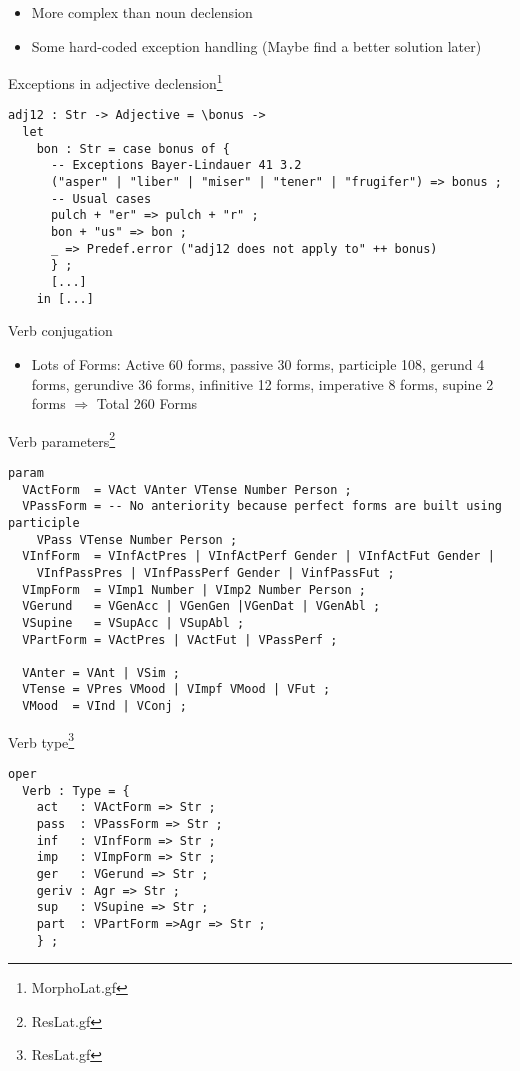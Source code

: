 \documentclass{beamer}
\begin{document}
\begin{frame}[fragile]
\begin{itemize}
  \item More complex than noun declension
  \item Some hard-coded exception handling (Maybe find a better solution later)
\end{itemize}
\begin{example}{Exceptions in adjective declension\footnote{MorphoLat.gf}}
\begin{Verbatim}
adj12 : Str -> Adjective = \bonus ->
  let
    bon : Str = case bonus of {
      -- Exceptions Bayer-Lindauer 41 3.2
      ("asper" | "liber" | "miser" | "tener" | "frugifer") => bonus ;
      -- Usual cases
      pulch + "er" => pulch + "r" ;
      bon + "us" => bon ;
      _ => Predef.error ("adj12 does not apply to" ++ bonus)
      } ;
      [...]
    in [...]
\end{Verbatim}
\end{example}
\end{frame}
\begin{frame}[fragile]{Verb conjugation}
\begin{itemize}
  \item Lots of Forms: Active 60 forms, passive 30 forms, participle 108, gerund 4 forms, gerundive 36 forms, infinitive 12 forms, imperative 8 forms, supine 2 forms $\Rightarrow$ Total 260 Forms
\end{itemize}
\begin{example}{Verb parameters\footnote{ResLat.gf}}
\begin{Verbatim}
param 
  VActForm  = VAct VAnter VTense Number Person ;
  VPassForm = -- No anteriority because perfect forms are built using participle
    VPass VTense Number Person ; 
  VInfForm  = VInfActPres | VInfActPerf Gender | VInfActFut Gender | 
    VInfPassPres | VInfPassPerf Gender | VinfPassFut ;
  VImpForm  = VImp1 Number | VImp2 Number Person ;
  VGerund   = VGenAcc | VGenGen |VGenDat | VGenAbl ;
  VSupine   = VSupAcc | VSupAbl ;
  VPartForm = VActPres | VActFut | VPassPerf ;

  VAnter = VAnt | VSim ;
  VTense = VPres VMood | VImpf VMood | VFut ; 
  VMood  = VInd | VConj ;
\end{Verbatim}
\end{example}
\end{frame}
\begin{frame}[fragile]
\begin{example}{Verb type\footnote{ResLat.gf}}
\begin{Verbatim}
oper
  Verb : Type = {
    act   : VActForm => Str ;
    pass  : VPassForm => Str ;
    inf   : VInfForm => Str ;
    imp   : VImpForm => Str ;
    ger   : VGerund => Str ;
    geriv : Agr => Str ; 
    sup   : VSupine => Str ;
    part  : VPartForm =>Agr => Str ;
    } ;
\end{Verbatim}
\end{example}
\end{frame}
\end{document}

